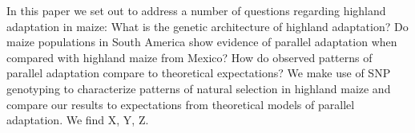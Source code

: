 In this paper we set out to address a number of questions regarding highland adaptation in maize: What is the genetic architecture of highland adaptation? Do maize populations in South America show evidence of parallel adaptation when compared with highland maize from Mexico? How do observed patterns of parallel adaptation compare to theoretical expectations?
We make use of SNP genotyping to characterize patterns of natural selection in highland maize and compare our results to expectations from theoretical models of parallel adaptation.  We find X, Y, Z.
